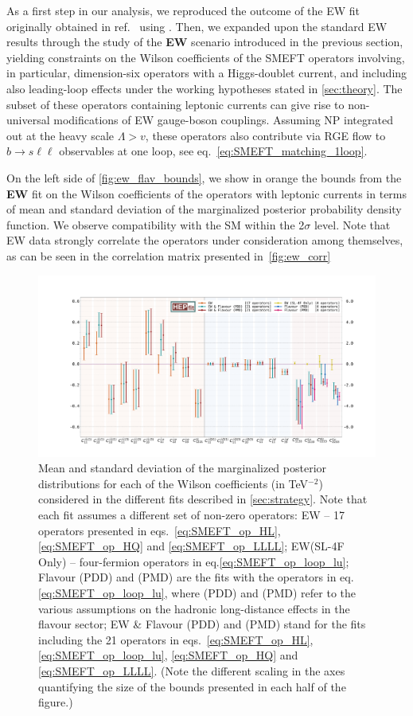 As a first step in our analysis, we reproduced the outcome of the EW fit originally obtained in ref.~\cite{Efrati:2015eaa} using \HEPfit. %
Then, we expanded upon the standard EW results through the study of the {\bf EW} scenario introduced in the previous section, yielding constraints on the Wilson coefficients of the SMEFT operators involving, in particular, dimension-six operators with a Higgs-doublet current, and including also leading-loop effects under the working hypotheses stated in \autoref{sec:theory}. The subset of these operators containing leptonic currents can give rise to non-universal modifications of EW gauge-boson couplings. Assuming NP integrated out at the heavy scale $\Lambda > v$, these operators also contribute via RGE flow to $b \to s \ell \ell $ observables at one loop, see eq.~\eqref{eq:SMEFT_matching_1loop}.

{On the left side of \autoref{fig:ew_flav_bounds}, we show in orange the bounds from the {\bf EW} fit on the Wilson coefficients of the operators with leptonic currents in terms of mean and standard deviation of the marginalized posterior probability density function. We observe compatibility with the SM within the 2$\sigma$ level. Note that EW data strongly correlate the operators under consideration among themselves, as can be seen in the correlation matrix presented in~\autoref{fig:ew_corr}}
\newpage
\begin{figure}
	\centering
	\includegraphics[width=\textwidth]{figures/errorbar.pdf}
	\caption{Mean and standard deviation of the marginalized posterior distributions for each of the Wilson coefficients (in TeV$^{-2}$) considered in the different fits described in \autoref{sec:strategy}.
		Note that each fit assumes a different set of non-zero operators:
		EW -- 17 operators presented in eqs.~\eqref{eq:SMEFT_op_HL}, \eqref{eq:SMEFT_op_HQ} and \eqref{eq:SMEFT_op_LLLL};  EW(SL-4F Only) -- four-fermion operators in eq.\eqref{eq:SMEFT_op_loop_lu}; Flavour (PDD) and (PMD) are the fits with the operators in eq.\eqref{eq:SMEFT_op_loop_lu}, where (PDD) and (PMD) refer to the various assumptions on the hadronic long-distance effects in the flavour sector; EW \& Flavour (PDD) and (PMD) stand for the fits including the 21 operators in eqs.~\eqref{eq:SMEFT_op_HL}, \eqref{eq:SMEFT_op_loop_lu}, \eqref{eq:SMEFT_op_HQ} and \eqref{eq:SMEFT_op_LLLL}. (Note the different scaling in the axes quantifying the size of the bounds presented in each half of the figure.)
	}
	\label{fig:ew_flav_bounds}
\end{figure}
\FloatBarrier

